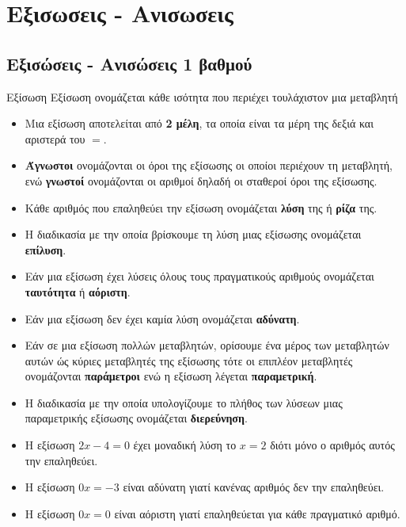 \chapter{Εξισωσεις - Ανισωσεις}
\section{Εξισώσεις - Ανισώσεις 1 βαθμού}
\orismoi
\begin{orismos}{Εξίσωση}
Εξίσωση ονομάζεται κάθε ισότητα που περιέχει τουλάχιστον μια μεταβλητή
\end{orismos}
\begin{itemize}[itemsep=0mm]
\item Μια εξίσωση αποτελείται από \textbf{2 μέλη}, τα οποία είναι τα μέρη της δεξιά και αριστερά του $ = $.
\item \textbf{Άγνωστοι} ονομάζονται οι όροι της εξίσωσης οι οποίοι περιέχουν τη μεταβλητή, ενώ \textbf{γνωστοί} ονομάζονται οι αριθμοί δηλαδή οι σταθεροί όροι της εξίσωσης.
\item Κάθε αριθμός που επαληθεύει την εξίσωση ονομάζεται \textbf{λύση} της ή \textbf{ρίζα} της.
\item Η διαδικασία με την οποία βρίσκουμε τη λύση μιας εξίσωσης ονομάζεται \textbf{επίλυση}.
\item Εάν μια εξίσωση έχει λύσεις όλους τους πραγματικούς αριθμούς ονομάζεται \textbf{ταυτότητα} ή \textbf{αόριστη}.
\item Εάν μια εξίσωση δεν έχει καμία λύση ονομάζεται \textbf{αδύνατη}.
\item Εάν σε μια εξίσωση πολλών μεταβλητών, ορίσουμε ένα μέρος των μεταβλητών αυτών ώς κύριες μεταβλητές της εξίσωσης τότε οι επιπλέον μεταβλητές ονομάζονται \textbf{παράμετροι} ενώ η εξίσωση λέγεται \textbf{παραμετρική}.
\item Η διαδικασία με την οποία υπολογίζουμε το πλήθος των λύσεων μιας παραμετρικής εξίσωσης ονομάζεται \textbf{διερεύνηση}.
\end{itemize}
\vspace{-7mm}
\begin{itemize}
\item Η εξίσωση $ 2x-4=0 $ έχει μοναδική λύση το $ x=2 $ διότι μόνο ο αριθμός αυτός την επαληθεύει.
\item Η εξίσωση $ 0x=-3 $ είναι αδύνατη γιατί κανένας αριθμός δεν την επαληθεύει.
\item Η εξίσωση $ 0x=0 $ είναι αόριστη γιατί επαληθεύεται για κάθε πραγματικό αριθμό.
\end{itemize}
